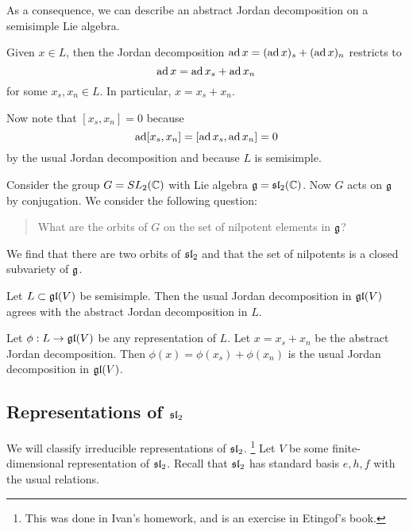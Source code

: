 \documentclass[twoside, 10pt]{article}
\begin{document}
    As a consequence, we can describe an abstract Jordan decomposition on a
    semisimple Lie algebra.

    \begin{cor} Given $x \in L$, then the Jordan
        decomposition $\operatorname{ad} x = (\operatorname{ad} x)_s + (\operatorname{ad} x)_n$ restricts to \[ \operatorname{ad} x =
        \operatorname{ad} x_s + \operatorname{ad} x_n\] for some $x_s, x_n \in L$. In particular, $x = x_s
    + x_n$.  \end{cor}

    Now note that $[x_s,x_n] = 0$ because \[\operatorname{ad} [x_s,x_n] = [\operatorname{ad} x_s, \operatorname{ad} x_n]
    = 0\] by the usual Jordan decomposition and because $L$ is semisimple.

    \begin{rmk} Consider the group $G = SL_2(\mathbb{C})$ with Lie
        algebra $\mathfrak{g} = \mathfrak{sl}_2(\mathbb{C})$. Now $G$ acts on $\mathfrak{g}$ by
        conjugation. We consider the following question:

        \begin{quote} What are the orbits of $G$ on the set of nilpotent
        elements in $\mathfrak{g}$?  \end{quote}

        We find that there are two orbits of $\mathfrak{sl}_2$ and that the set of
    nilpotents is a closed subvariety of $\mathfrak{g}$.  \end{rmk}

    \begin{thm} Let $L \subset \mathfrak{gl}(V)$ be semisimple. Then the usual Jordan
    decomposition in $\mathfrak{gl}(V)$ agrees with the abstract Jordan decomposition
in $L$.  \end{thm}

    \begin{cor} Let $\phi:L \to \mathfrak{gl}(V)$ be any representation of $L$. Let
    $x = x_s + x_n$ be the abstract Jordan decomposition. Then $\phi(x) =
\phi(x_s) + \phi(x_n)$ is the usual Jordan decomposition in $\mathfrak{gl}(V)$.
\end{cor}

    \subsection{Representations of $\mathfrak{sl}_2$}%
    \label{sub:representations_of_al_2_}
    
    We will classify irreducible representations of $\mathfrak{sl}_2$. \footnote{This
    was done in Ivan's homework, and is an exercise in Etingof's book.} Let $V$
    be some finite-dimensional representation of $\mathfrak{sl}_2$. Recall that
    $\mathfrak{sl}_2$ has standard basis $e,h,f$ with the usual relations.
\end{document}
